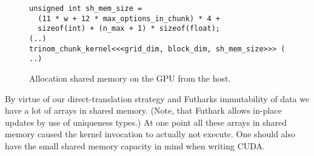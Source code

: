 %
\begin{figure}[bt]
\begin{center}
\begin{lstlisting}
unsigned int sh_mem_size =
  (11 * w + 12 * max_options_in_chunk) * 4 +
  sizeof(int) + (n_max + 1) * sizeof(float);
(..)
trinom_chunk_kernel<<<grid_dim, block_dim, sh_mem_size>>> ( ..)
\end{lstlisting}
\end{center}
\caption{Allocation shared memory on the GPU from the host.}
\label{fig:allocshmem}
\end{figure}
%
By virtue of our direct-translation strategy and Futharks
immutability of data we have a lot of arrays in shared
memory. (Note, that Futhark allows in-place updates by use
of uniqueness types.) At one point all these arrays in shared
memory caused the kernel invocation to actually not execute.
One should also have the small shared memory capacity in mind
when writing CUDA.

